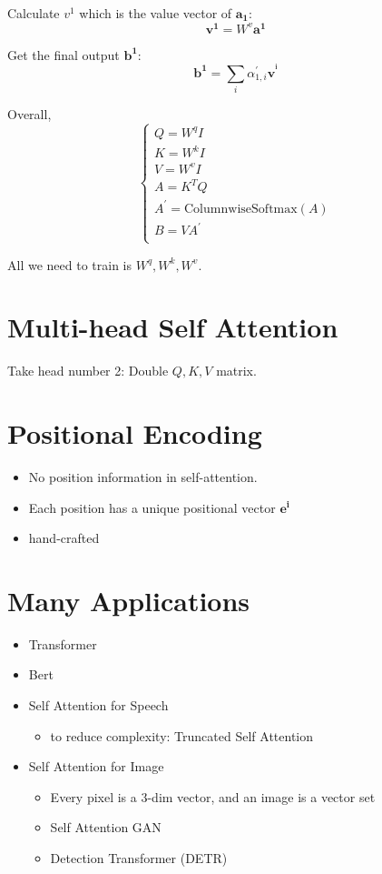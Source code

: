 \documentclass[11pt]{book}
\begin{document}
Calculate $v^1$ which is the value vector of $\bm{a_1}$: \[\bm{v^1}=W^v\bm{a^1}\]

Get the final output $\bm{b^1}$:
\[
    \bm{b^1}=\sum_i\alpha_{1,i}^{\prime}\bm{v^^i}   
\]

Overall,
\begin{displaymath}
    \begin{cases}
        Q=W^q I\\
        K=W^k I\\
        V=W^v I\\
        A=K^T Q\\
        A^{\prime}=\mathrm{ColumnwiseSoftmax}(A)\\
        B=VA^{\prime}\\
    \end{cases}
\end{displaymath}

All we need to train is $W^q,W^k,W^v$.

\section{Multi-head Self Attention}
Take head number 2: Double $Q,K,V$ matrix.

\section{Positional Encoding}
\begin{itemize}
    \item No position information in self-attention.
    \item Each position has a unique positional vector $\bm{e^i}$
    \item hand-crafted
\end{itemize}

\section{Many Applications}
\begin{itemize}
    \item Transformer
    \item Bert
    \item Self Attention for Speech
    \begin{itemize}
        \item to reduce complexity: Truncated Self Attention
    \end{itemize}
    \item Self Attention for Image
    \begin{itemize}
        \item Every pixel is a 3-dim vector, and an image is a vector set
        \item Self Attention GAN
        \item Detection Transformer (DETR)
    \end{itemize}
\end{itemize}
\end{document}
